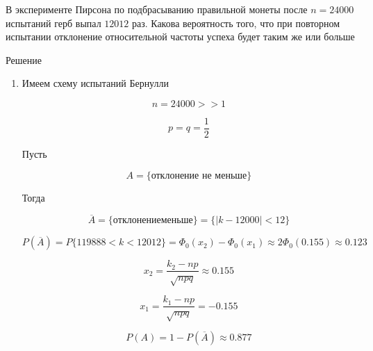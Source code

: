 \begin{example}
    В эксперименте Пирсона по подбрасыванию правильной монеты после $n=24000$ испытаний герб выпал $12012$ раз. Какова вероятность того, что при повторном испытании отклонение относительной частоты успеха будет таким же или больше

    Решение

    \begin{enumerate}
        \item Имеем схему испытаний Бернулли

            \begin{equation*}
                n=24000 >> 1
            \end{equation*}

            \begin{equation*}
                p = q = \frac{1}{2}
            \end{equation*}

            Пусть

            \begin{equation*}
                A = \{ \text{отклонение не меньше} \}
            \end{equation*}

            Тогда

            \begin{equation*}
                \overline A = \{ отклонение меньше \} = \{ |k-12000| < 12 \}
            \end{equation*}

            \begin{equation*}
                P(\overline A) = P \{ 119888 < k < 12012 \} = \Phi_0(x_2) - \Phi_0(x_1) \approx 2\Phi_0(0.155) \approx 0.123
            \end{equation*}

            \begin{equation*}
                x_2 = \frac{k_2 - np}{\sqrt{npq}} \approx 0.155
            \end{equation*}

            \begin{equation*}
                x_1 = \frac{k_1 - np}{\sqrt{npq}} = -0.155
            \end{equation*}

            \begin{equation*}
                P(A) = 1 - P(\overline A) \approx 0.877
            \end{equation*}
    \end{enumerate}
\end{example}
